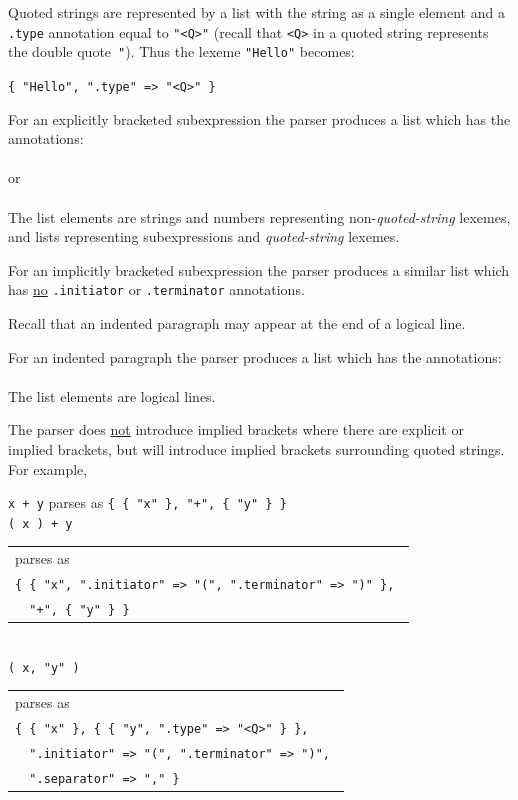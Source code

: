 \documentclass[12pt]{article}
\newenvironment{indpar}[1][0.3in]%
	{\begin{list}{}%
		     {\setlength{\itemsep}{0in}%
		      \setlength{\topsep}{0in}%
		      \setlength{\parsep}{1ex}%
		      \setlength{\labelwidth}{#1}%
		      \setlength{\leftmargin}{#1}%
		      \addtolength{\leftmargin}{\labelsep}}%
	 \item}%
	{\end{list}}
\begin{document}
Quoted strings are represented by a list with the string as a single element
and a {\tt .type} annotation equal to {\tt "<Q>"}
(recall that {\tt <Q>} in a quoted string represents the double quote~{\tt "}).
Thus the lexeme {\tt "Hello"} becomes: \\
\centerline{\tt \{ "Hello", ".type" => "<Q>" \} }

For an explicitly bracketed subexpression the parser produces a list which has
the annotations: \\
\hspace*{0.5in}{\tt ".initiator" => "(", ".terminator" => ")"} \\
or \\
\hspace*{0.5in}{\tt ".initiator" => "[", ".terminator" => "]"} \\
The list elements are strings and numbers representing non-{\em quoted-string}
lexemes, and lists representing subexpressions and {\em quoted-string} lexemes.

For an implicitly bracketed subexpression the parser produces a similar
list which has
\underline{no} {\tt .initiator} or {\tt .terminator} annotations.

Recall that an indented paragraph may appear at the end of a logical line.

For an indented paragraph the parser produces a list
which has the annotations: \\
\hspace*{0.5in}{\tt ".initiator" => ":",
                    ".terminator" => *INDENTED-PARAGRAPH*} \\
The list elements are logical lines.

The parser does \underline{not} introduce implied brackets where there
are explicit or implied brackets, but will introduce implied brackets
surrounding quoted strings.  For example,
\begin{indpar}
{\tt x + y} parses as {\tt \{ \{ "x" \}, "+", \{ "y" \} \}} \\
{\tt ( x ) + y} \begin{tabular}[t]{@{}l@{}}
		parses as \\
                \tt \{ \{ "x", ".initiator" => "(", ".terminator" => ")" \}, \\
		\tt ~~"+", \{ "y" \} \} \\
                \end{tabular} \\
{\tt ( x, "y" )} \begin{tabular}[t]{@{}l@{}}
		parses as \\
                \tt \{ \{ "x" \}, \{ \{ "y", ".type" => "<Q>" \} \}, \\
		\tt ~~".initiator" => "(", ".terminator" => ")", \\
		\tt ~~".separator" => "," \} \\
                \end{tabular}
\end{indpar}
\end{document}
